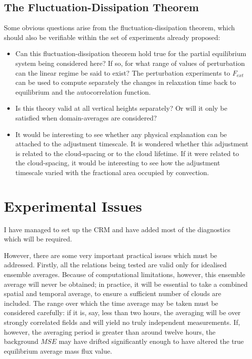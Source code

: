 \documentclass[11pt,a4paper]{article}
\begin{document}
\subsection{The Fluctuation-Dissipation Theorem}
Some obvious questions arise from the fluctuation-dissipation theorem,
which should also be verifiable within the set of experiments already proposed:
\begin{itemize}
\item Can this fluctuation-dissipation theorem hold true for the partial
equilibrium system being considered here? If so, for what range of
values of perturbation can the linear regime be said to exist? The
perturbation experiments to $F_{ext}$ can be used to compute
separately the changes
in relaxation time back to equilibrium and the autocorrelation function.
\item Is this theory valid at all vertical heights separately? Or will
it only be satisfied when domain-averages are considered? 
\item It would be interesting to see whether any physical explanation
can be attached to the adjustment timescale. It is wondered whether
this adjustment is related to the cloud-spacing or to the cloud
lifetime. If it were related to the cloud-spacing, it would be
interesting to see how the adjustment timescale varied with the
fractional area occupied by convection.
\end{itemize}

\section{Experimental Issues}
I have managed to set up the CRM and have added most of the
diagnostics which will be required. 

However, there are some very important practical issues which must be
addressed. Firstly, all the relations being tested are valid only for
idealised ensemble averages. Because of computational
limitations, however, this ensemble average will never be obtained; in practice, it will be essential to take a combined spatial and
temporal average, to ensure a sufficient number of clouds are included. The range over which the time average may be taken
must be considered carefully: if it is, say, less than two
hours, the averaging will be over strongly correlated fields and will
yield no truly independent measurements. If, however, the averaging
period is greater than around twelve hours, the
background $MSE$ may have drifted significantly enough to have altered
the true equilibrium average mass flux value.
\end{document}
